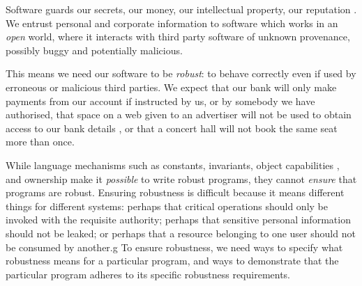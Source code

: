 Software guards our secrets, our money, our intellectual property,
our reputation \cite{covern}.  We entrust personal and
corporate information to software which works in an \emph{open} world, 
where  it interacts with 
third party software of unknown provenance, possibly buggy and potentially malicious.

This means we need our software to be \emph{robust}:
to behave correctly even if  used 
by erroneous or malicious third parties.
We expect that our bank will only make payments 
from our account if instructed by us, or by somebody we have authorised, 
that space on a web given to an advertiser will not be used
to obtain access to our bank details \cite{cwe}, or that a
concert hall will not book the same seat more than once.



While language mechanisms such as constants, invariants, 
object capabilities \cite{MillerPhD}, and 
ownership \cite{ownalias} 
make it \textit{possible} to write robust
programs, they cannot \textit{ensure} that programs are robust.
Ensuring robustness is difficult because it means 
different things for different systems: perhaps
that critical operations should only be invoked with the requisite authority;
perhaps that sensitive personal information should not be leaked; 
or perhaps that a resource belonging to one user should not be consumed by another.g
%
To ensure robustness, we need ways to specify what robustness means for a 
particular program, and ways to demonstrate that the particular program 
adheres to its specific robustness requirements.


